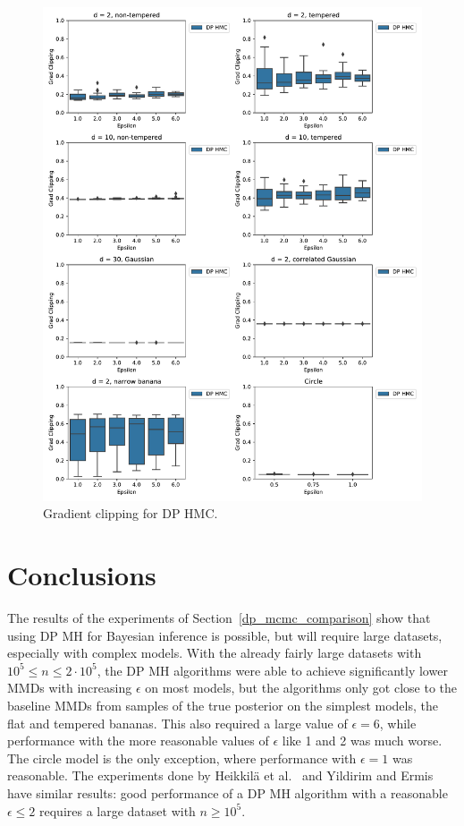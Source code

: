 \documentclass[english,twoside,openright]{HYgraduMLDS}
\begin{document}
\begin{figure}
  \centering
  \includegraphics[width=\textwidth]{figures/grad_clipping}
  \caption{
    Gradient clipping for DP HMC.
  }
  \label{grad_clipping_fig}
\end{figure}

\chapter{Conclusions}\label{conclusion_chapter}

The results of the experiments of Section~\ref{dp_mcmc_comparison} show that
using DP MH for Bayesian inference is possible, but will require large
datasets, especially with complex models. With the already fairly large datasets
with \(10^{5} \leq n \leq 2\cdot 10^{5}\), the DP MH algorithms were able to
achieve significantly lower MMDs with increasing \(\epsilon\) on most models,
but the algorithms only got close to the baseline MMDs from samples of the
true posterior on the simplest models, the flat and tempered bananas. This also
required a large value of \(\epsilon = 6\), while performance with the more
reasonable values of \(\epsilon\) like 1 and 2 was much worse. The circle model
is the only exception, where performance with \(\epsilon = 1\) was reasonable.
The experiments done by Heikkilä et al.~\cite{HeikkilaJDH19}
and Yildirim and Ermis~\cite{YildirimE19} have similar results: good performance
of a DP MH algorithm with a reasonable \(\epsilon \leq 2\) requires a large
dataset with \(n \geq 10^{5}\).
\end{document}
